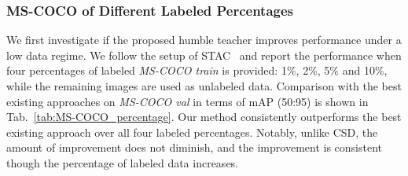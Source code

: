 \documentclass[final]{cvpr}
\begin{document}
\subsubsection{MS-COCO of Different Labeled Percentages}
\label{sec:coco_percentage}
We first investigate if the proposed humble teacher improves performance under a low data regime. We follow the setup of STAC~\cite{sohn2020simple} and report the performance when four percentages of labeled \textit{MS-COCO train} is provided: 1\%, 2\%, 5\% and 10\%, while the remaining images are used as unlabeled data. Comparison with the best existing approaches on \textit{MS-COCO val} in terms of mAP (50:95) is shown in Tab.~\ref{tab:MS-COCO_percentage}.
Our method consistently outperforms the best existing approach over all four labeled percentages.
Notably, unlike CSD, the amount of improvement does not diminish, and the improvement is consistent though the percentage of labeled data increases.

\begin{table}\centering
  \caption{The mAP (50:95) results on \textbf{\textit{MS-COCO val 2017}} by models trained on \textit{MS-COCO train 2017} + \textit{MS-COCO unlabeled}. CSD~is with a ResNet-50 backbone.}
  \label{tab:MS-COCO_unlabeled_exps}
\end{table}
\end{document}
